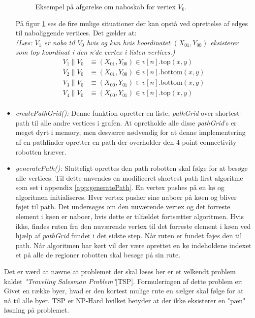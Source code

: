 \begin{itemize}
\begin{figure}[h!]
	\centering
\begin{tikzpicture}[scale=1]
    
    \end{tikzpicture}
	\caption{Eksempel på afgørelse om naboskab for vertex $V_0$.}
	\label{fig:coordRelation}
\end{figure}
På figur \ref{fig:coordRelation} ses de fire mulige situationer der kan opstå ved oprettelse af edges til naboliggende vertices. Det gælder at: \\
\scriptsize\emph{(Læs: $V_1$ er nabo til $V_0$ hvis og kun hvis koordinatet $(X_{01},Y_{00})$ eksisterer som top koordinat i den n'de vertex i listen vertices.)}
\normalsize	 	 
	 \begin{align*}
	 V_1\parallel V_0 & \equiv(X_{01},Y_{00})\in v[n].\text{top}(x,y)	 \\
	 V_2\parallel V_0 & \equiv(X_{01},Y_{00})\in v[n].\text{bottom}(x,y)\\
	 V_3\parallel V_0 & \equiv(X_{00},Y_{01})\in v[n].\text{bottom}(x,y)\\
	 V_4\parallel V_0 & \equiv(X_{00},Y_{01})\in v[n].\text{top}(x,y)\\
	 \end{align*}
	 \item \emph{createPathGrid():} Denne funktion opretter en liste, \emph{pathGrid} over shortest-path til alle andre vertices i grafen. At opretholde alle disse \emph{pathGrid}'s er meget dyrt i memory, men desværre nødvendig for at denne implementering af en pathfinder opretter en path der overholder den 4-point-connectivity robotten kræver.
	 \item \emph{generatePath():} Slutteligt oprettes den path robotten skal følge for at besøge alle vertices. Til dette anvendes en modificeret shortest path first algoritme som set i appendix \ref{app:generatePath}. En vertex pushes på en kø og algoritmen initialiseres. Hver vertex pusher sine naboer på køen og bliver føjet til path. Det undersøges om den nuværende vertex og det forreste element i køen er naboer, hvis dette er tilfældet fortsætter algoritmen. Hvis ikke, findes ruten fra den nuværende vertex til det forreste element i køen ved hjælp af \emph{pathGrid} fundet i det sidste step. Når ruten er fundet føjes den til path. Når algoritmen har kørt vil der være oprettet en kø indeholdene indexet et på alle de regioner robotten skal besøge på sin rute.
\end{itemize}
Det er værd at nævne at problemet der skal løses her er et velkendt problem kaldet \textit{"Traveling Salesman Problem"}[TSP]. Formuleringen af dette problem er: Givet en række byer, hvad er den kortest mulige rute en sælger skal følge for at nå til alle byer. TSP er NP-Hard hvilket betyder at der ikke eksisterer en "pæn" løsning på problemet. \\~\\


